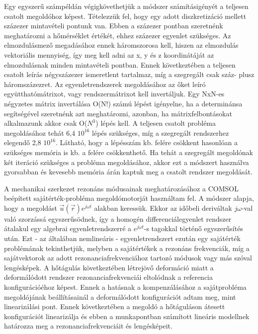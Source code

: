 Egy egyszerű számpéldán végigkövethetjük a módszer számításigényét a teljesen csatolt megoldóhoz képest. Tételezzük fel, hogy egy adott diszkretizáció mellett százezer mintavételi pontunk van. Ebben a százezer pontban szeretnénk meghatározni a hőmérséklet értékét, ehhez százezer egyenlet szükséges. Az elmozdulásmező megadásához ennek háromszorosa kell, hiszen az elmozdulás vektoriális mennyiség, így meg kell adni az x, y és z koordinátáját az elmozdulásnak minden mintavételi pontban. Ennek következtében a teljesen csatolt leírás négyszázezer ismeretlent tartalmaz, míg a szegregált csak száz- plusz háromszázezret. Az egyenletrendszerek megoldásához az őket leíró együtthatómátrixot, vagy rendszermátrixot kell invertáljuk. Egy NxN-es négyzetes mátrix invertálása O(N!) számú lépést igényelne, ha a determinánsa segítségével szeretnénk azt meghatározni, azonban, ha mátrixfelbontásokat alkalmazunk akkor csak O($N^3$) lépés kell. A teljesen csatolt probléma megoldásához tehát 6,4 $10^{16}$ lépés szükséges, míg a szegregált rendszerhez elegendő 2,8 $10^{16}$. Látható, hogy a lépésszám kb. felére csökkent hasonlóan a szükséges memória is kb. a felére csökkenthető. Ha tehát a szegregált megoldónak két iteráció szükséges a probléma megoldásához, akkor ezt a módszert használva gyorsabban és kevesebb memória árán kaptuk meg a csatolt rendszer megoldását.


A mechanikai szerkezet rezonáns módusainak meghatározásához a COMSOL beépített sajátérték-probléma megoldómotorját használtam fel. A módszer alapja, hogy a megoldást $\vec{u}(\vec{r})e^{j\omega t}$ alakban keressük. Ekkor az időbeli deriváltak $j\omega$-val való szorzássá egyszerűsödnek, így a homogén differenciálegyenlet rendszer átalakul egy algebrai egyenletrendszerré a $e^{j\omega t}$-s tagokkal történő egyszerűsítés után. Ezt - az általában nemlineáris - egyenletrendszert ezután egy sajátérték problémának tekinthetjük, melyben a sajátértékek a rezonáns frekvenciák, míg a sajátvektorok az adott rezonanciafrekvenciához tartozó módusok vagy más szóval lengésképek. A hőtágulás következtében létrejövő deformáció miatt a deformálódott rendszer rezonanciafrekvenciái eltolódnak a referencia konfigurációéhoz képest. Ennek a hatásnak a kompenzálásához a sajátprobléma megoldójának beállításainál a deformálódott konfigurációt adtam meg, mint linearizálási pont. Ennek következtében a megoldó a hőtáguláson átesett konfigurációt linearizálja és ebben a munkapontban számított lineáris modellnek határozza meg a rezonanciafrekvenciáit és lengésképeit.

